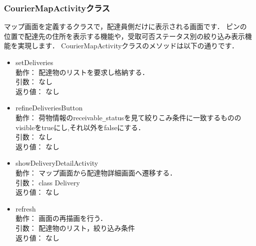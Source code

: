\documentclass[a4j,titlepage]{jarticle}
\begin{document}
\subsubsection{CourierMapActivityクラス}
マップ画面を定義するクラスで，配達員側だけに表示される画面です．
ピンの位置で配達先の住所を表示する機能や，受取可否ステータス別の絞り込み表示機能を実現します．
CourierMapActivityクラスのメソッドは以下の通りです．
\begin{itemize}
\item setDeliveries\\
  動作： 配達物のリストを要求し格納する．\\
引数： なし\\
返り値： なし

\item refineDeliveriesButton\\
動作： 荷物情報のreceivable\verb|_|statusを見て絞りこみ条件に一致するもののvisibleをtrueにし,それ以外をfalseにする．\\
引数： なし\\
返り値： なし

\item showDeliveryDetailActivity\\
動作： マップ画面から配達物詳細画面へ遷移する．\\
引数： class Delivery\\
返り値： なし

\item refresh\\
動作： 画面の再描画を行う．\\
引数： 配達物のリスト，絞り込み条件\\
返り値： なし
\end{itemize}
\end{document}
